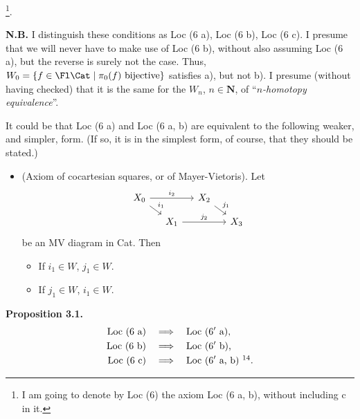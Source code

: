 \noindent\footnote[13]{I am going to denote by Loc (6) the axiom Loc (6 a, b), without including c in it.}.

\textbf{N.B.} I distinguish these conditions as Loc (6 a), Loc (6 b), Loc (6 c). I presume that we will never have to make use of Loc (6 b), without also assuming Loc (6 a), but the reverse is surely not the case. Thus, $W_0=\{f\in\Fl\Cat\mid\pi_0(f)\text{ bijective}\}$ satisfies a), but not b). I presume (without having checked) that it is the same for the $W_n$, $n\in\mathbf{N}$, of ``\textit{$n$-homotopy equivalence}''.

It could be that Loc (6 a) and Loc (6 a, b) are equivalent to the following weaker, and simpler, form. (If so, it is in the simplest form, of course, that they should be stated.)

\begin{itemize}[leftmargin=5em,labelwidth=4em,align=left]
\item[\textbf{Loc 6$'$}] (Axiom of cocartesian squares, or of Mayer-Vietoris). Let
\[
\begin{tikzcd}[row sep=small,column sep=small]
X_0 \arrow[rr,"i_2"] \arrow[dr,"i_1"] & & X_2 \arrow[dr,"j_1"] & \\
& X_1 \arrow[rr,"j_2"] & & X_3
\end{tikzcd}
\]
be an MV diagram in Cat. Then
\begin{itemize}[leftmargin=3em,labelwidth=2.5em,align=right]
\item[a)] If $i_1\in W$, $j_1\in W$.
\item[b)] If $j_1\in W$, $i_1\in W$.
\end{itemize}
\end{itemize}

\textbf{Proposition 3.1.}
\[
\begin{aligned}
\text{Loc (6 a)}\quad &\Longrightarrow\quad \text{Loc (6$'$ a),}\\
\text{Loc (6 b)}\quad &\Longrightarrow\quad \text{Loc (6$'$ b),}\\
\text{Loc (6 c)}\quad &\Longrightarrow\quad \text{Loc (6$'$ a, b)}\ \footnotemark[14].
\end{aligned}
\]

